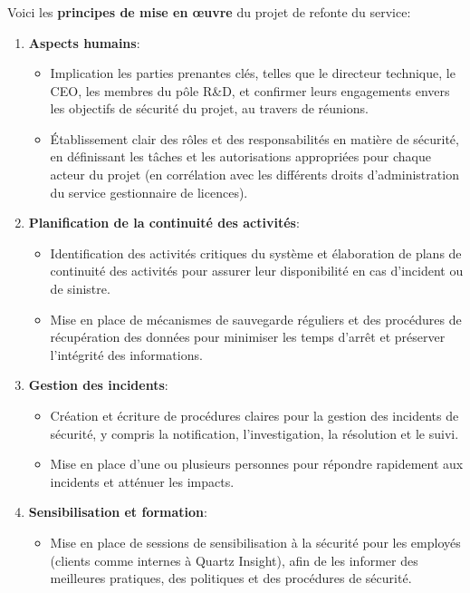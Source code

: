 \documentclass[a4paper, 11pt]{report}
\begin{document}
  \subsubsection{}
  Voici les \textbf{principes de mise en œuvre} du projet de refonte du service:
  \begin{enumerate}
    \item \textbf{Aspects humains}:
      \begin{itemize}
        \item Implication les parties prenantes clés, telles que le directeur technique, le CEO, les membres du pôle R&D, et confirmer leurs engagements envers les objectifs de sécurité du projet, au travers de réunions.
        \item Établissement clair des rôles et des responsabilités en matière de sécurité, en définissant les tâches et les autorisations appropriées pour chaque acteur du projet (en corrélation avec les différents droits d'administration du service gestionnaire de licences).
      \end{itemize}
    \item \textbf{Planification de la continuité des activités}:
      \begin{itemize}
        \item Identification des activités critiques du système et élaboration de plans de continuité des activités pour assurer leur disponibilité en cas d'incident ou de sinistre.
        \item Mise en place de mécanismes de sauvegarde réguliers et des procédures de récupération des données pour minimiser les temps d'arrêt et préserver l'intégrité des informations.
      \end{itemize}
    \item \textbf{Gestion des incidents}:
      \begin{itemize}
        \item Création et écriture de procédures claires pour la gestion des incidents de sécurité, y compris la notification, l'investigation, la résolution et le suivi.
        \item Mise en place d'une ou plusieurs personnes pour répondre rapidement aux incidents et atténuer les impacts.
      \end{itemize}
    \item \textbf{Sensibilisation et formation}:
      \begin{itemize}
        \item Mise en place de sessions de sensibilisation à la sécurité pour les employés (clients comme internes à Quartz Insight), afin de les informer des meilleures pratiques, des politiques et des procédures de sécurité. \

\end{itemize}
\end{enumerate}
\end{document}
